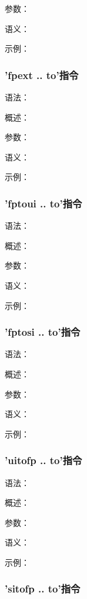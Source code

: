 \documentclass[12pt,a4paper]{article}
\begin{document}
{参数：

语义：

示例：


\subsubsection{'fpext .. to'指令} %

语法：

概述：

参数：

语义：

示例：


\subsubsection{'fptoui .. to'指令} %

语法：

概述：

参数：

语义：

示例：


\subsubsection{'fptosi .. to'指令} %

语法：

概述：

参数：

语义：

示例：


\subsubsection{'uitofp .. to'指令} %

语法：

概述：

参数：

语义：

示例：


\subsubsection{'sitofp .. to'指令} %

}
\end{document}
